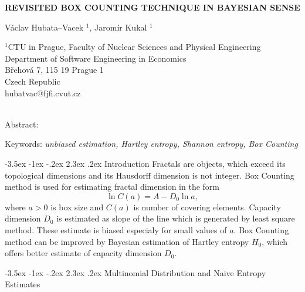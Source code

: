 \documentclass[a4paper,10pt]{article}
\makeatletter
\renewcommand\section{\@startsection {section}{1}{\z@}%
                                   {-3.5ex \@plus -1ex \@minus -.2ex}%
                                   {2.3ex \@plus.2ex}%
                                   {\large\bfseries}}
\makeatother
\begin{document}
\pagestyle{empty}

\begin{center}
{\bf \Large REVISITED BOX COUNTING TECHNIQUE IN BAYESIAN SENSE}
\end{center}

\smallskip
\begin{center}
{\large V\'{a}clav Hubata--Vacek $^1$, Jarom\'{i}r Kukal $^1$}
\end{center}

\smallskip
\begin{center}
$^1$CTU in Prague, Faculty of Nuclear Sciences and Physical Engineering\\
Department of Software Engineering in Economics\\
B\v{r}ehov\'{a} 7, 115 19 Prague 1 \\
Czech Republic\\
hubatvac@fjfi.cvut.cz\\
 ~\\

\end{center}

\bigskip
\noindent Abstract: \textit{}

\vspace*{10pt} \noindent Keywords: \textit{unbiased estimation, Hartley entropy, Shannon entropy, Box Counting}


\bigskip
\section {Introduction }
Fractals are objects, which exceed its topological dimensions and its Hausdorff dimension is not integer. Box Counting method is used for estimating fractal dimension in the form
\begin{equation} 
\label{eq:boxcount}
\ln{C(a)} = A - D_{0}\ln{a},
\end{equation}
where $a>0$ is box size and $C(a)$ is number of covering elements. Capacity dimension $D_{0}$ is estimated as slope of the line which is generated by least square method. These estimate is biased especialy for small values of $a$. Box Counting method can be improved by Bayesian estimation of Hartley entropy $H_{0}$, which offers better estimate of capacity dimension $D_{0}$.

\section {Multinomial Distribution and Naive Entropy Estimates}
\end{document}
